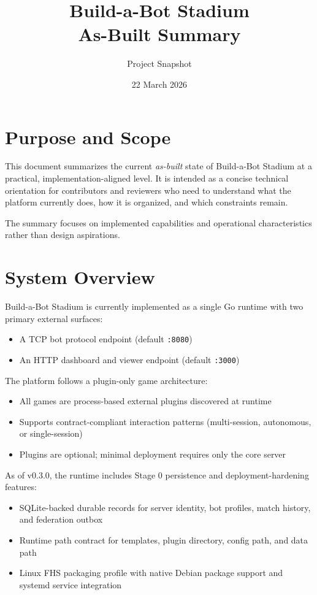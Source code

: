 \documentclass[11pt]{article}
\title{Build-a-Bot Stadium\\As-Built Summary}
\author{Project Snapshot}
\date{22 March 2026}
\begin{document}
\maketitle

\section{Purpose and Scope}
This document summarizes the current \emph{as-built} state of Build-a-Bot Stadium at a practical, implementation-aligned level. It is intended as a concise technical orientation for contributors and reviewers who need to understand what the platform currently does, how it is organized, and which constraints remain.

The summary focuses on implemented capabilities and operational characteristics rather than design aspirations.

\section{System Overview}
Build-a-Bot Stadium is currently implemented as a single Go runtime with two primary external surfaces:
\begin{itemize}[leftmargin=*]
  \item A TCP bot protocol endpoint (default \texttt{:8080})
  \item An HTTP dashboard and viewer endpoint (default \texttt{:3000})
\end{itemize}

The platform follows a plugin-only game architecture:
\begin{itemize}[leftmargin=*]
  \item All games are process-based external plugins discovered at runtime
  \item Supports contract-compliant interaction patterns (multi-session, autonomous, or single-session)
  \item Plugins are optional; minimal deployment requires only the core server
\end{itemize}

As of v0.3.0, the runtime includes Stage 0 persistence and deployment-hardening features:
\begin{itemize}[leftmargin=*]
  \item SQLite-backed durable records for server identity, bot profiles, match history, and federation outbox
  \item Runtime path contract for templates, plugin directory, config path, and data path
  \item Linux FHS packaging profile with native Debian package support and systemd service integration
\end{itemize}
\end{document}
